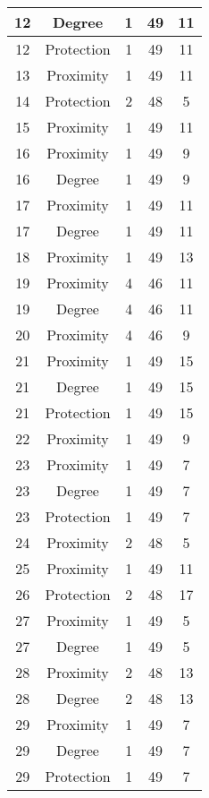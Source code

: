 \documentclass[results.tex]{subfiles}
\begin{document}
\begin{center}
\begin{tabular}{| c || c | c | c | c |}
    \hline
    12 & Degree & 1 & 49 & 11 \\ 
    \hline
    12 & Protection & 1 & 49 & 11 \\ 
    \hline
    13 & Proximity & 1 & 49 & 11 \\ 
    \hline
    14 & Protection & 2 & 48 & 5 \\ 
    \hline
    15 & Proximity & 1 & 49 & 11 \\ 
    \hline
    16 & Proximity & 1 & 49 & 9 \\ 
    \hline
    16 & Degree & 1 & 49 & 9 \\ 
    \hline
    17 & Proximity & 1 & 49 & 11 \\ 
    \hline
    17 & Degree & 1 & 49 & 11 \\ 
    \hline
    18 & Proximity & 1 & 49 & 13 \\ 
    \hline
    19 & Proximity & 4 & 46 & 11 \\ 
    \hline
    19 & Degree & 4 & 46 & 11 \\ 
    \hline
    20 & Proximity & 4 & 46 & 9 \\ 
    \hline
    21 & Proximity & 1 & 49 & 15 \\ 
    \hline
    21 & Degree & 1 & 49 & 15 \\ 
    \hline
    21 & Protection & 1 & 49 & 15 \\ 
    \hline
    22 & Proximity & 1 & 49 & 9 \\ 
    \hline
    23 & Proximity & 1 & 49 & 7 \\ 
    \hline
    23 & Degree & 1 & 49 & 7 \\ 
    \hline
    23 & Protection & 1 & 49 & 7 \\ 
    \hline
    24 & Proximity & 2 & 48 & 5 \\ 
    \hline
    25 & Proximity & 1 & 49 & 11 \\ 
    \hline
    26 & Protection & 2 & 48 & 17 \\ 
    \hline
    27 & Proximity & 1 & 49 & 5 \\ 
    \hline
    27 & Degree & 1 & 49 & 5 \\ 
    \hline
    28 & Proximity & 2 & 48 & 13 \\ 
    \hline
    28 & Degree & 2 & 48 & 13 \\ 
    \hline
    29 & Proximity & 1 & 49 & 7 \\ 
    \hline
    29 & Degree & 1 & 49 & 7 \\ 
    \hline
    29 & Protection & 1 & 49 & 7 \\ 

\end{tabular}
\end{center}
\end{document}
